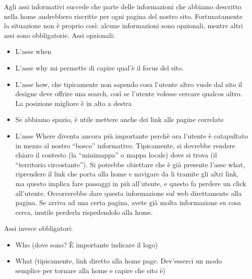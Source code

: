 Agli assi informativi succede che parte delle informazioni che abbiamo descritto nella home andrebbero riscritte per ogni pagina del nostro sito. Fortunatamente la situazione non \`e proprio cos\`i: alcune informazioni sono opzionali, mentre altri assi sono obbligatorie. Assi opzionali:
\begin{itemize}

\item L'asse when

\item L'asse why mi permette di capire qual'\`e il focus del sito.

\item L'asse how, che tipicamente non sapendo cosa l'utente altro vuole dal sito il designe deve offrire una search, cos\`i se l'utente volesse cercare qualcos altro. La posizione migliore \`e in alto a destra

\item Se abbiamo spazio, \`e utile mettere anche dei link alle pagine correlate

\item L'asse Where diventa ancora pi\`u importante perch\`e ora l'utente \`e catapultato in mezzo al nostro ``bosco'' informativo. Tipicamente, si dovrebbe rendere chiaro il contesto (la ``minimappa'' o mappa locale) dove si trova (il ``territorio circostante''). Si potrebbe obiettare che \`e gi\`a presente l'asse what, riprendere il link che porta alla home e navigare da li tramite gli altri link, ma questo implica fare passaggi in pi\`u all'utente, e questo fa perdere un click all'utente. Occorrerebbe dare questa informazione sul web direttamente alla pagina. Se arriva ad una certa pagina, avete gi\`a molta informazione su cosa cerca, inutile perderla rispedendolo alla home.

\end{itemize}

Assi invece obbligatori:

\begin{itemize}

\item Who (dove sono? \`E importante indicare il logo)

\item What (tipicamente, link diretto alla home page. Dev'esserci un modo semplice per tornare alla home e capire che sito \`e)

\end{itemize}

